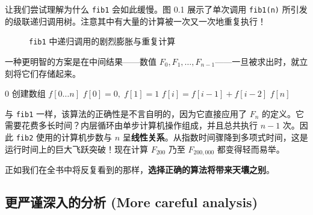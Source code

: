 让我们尝试理解为什么 \texttt{fib1} 会如此缓慢。图 0.1 展示了单次调用 \texttt{fib1(n)} 所引发的级联递归调用树。注意其中有大量的计算被一次又一次地重复执行！

\begin{figure}[htbp]
\centering
{}
\caption{\texttt{fib1} 中递归调用的剧烈膨胀与重复计算}
\label{fig:fib_tree}
\end{figure}

一种更明智的方案是在中间结果——数值 $F_0, F_1, \dots, F_{n-1}$——一旦被求出时，就立刻将它们存储起来。

\begin{tcolorbox}[colback=white,colframe=gray!50!black,title={\textbf{算法}\quad \texttt{fib2}}]
\begin{algorithmic}[1]
     \Return $0$ \EndIf
    \State 创建数组 $f[0 \dots n]$
    \State $f[0] = 0,\; f[1] = 1$
        \State $f[i] = f[i - 1] + f[i - 2]$
    \EndFor
    \State \Return $f[n]$
\EndFunction
\end{algorithmic}
\end{tcolorbox}

与 \texttt{fib1} 一样，该算法的正确性是不言自明的，因为它直接应用了 $F_n$ 的定义。它需要花费多长时间？内层循环由单步计算机操作组成，并且总共执行 $n - 1$ 次。因此 \texttt{fib2} 使用的计算机步数与 $n$ 呈\textbf{线性关系}。从指数时间骤降到多项式时间，这是运行时间上的巨大飞跃突破！现在计算 $F_{200}$ 乃至 $F_{200,000}$ 都变得轻而易举。

正如我们在全书中将反复看到的那样，\textbf{选择正确的算法将带来天壤之别}。

\subsection*{更严谨深入的分析 (More careful analysis)}

